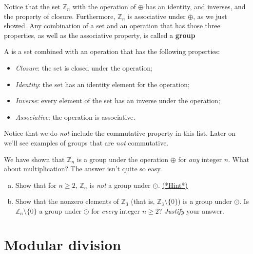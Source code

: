 Notice that the set ${\mathbb Z}_n$ with the operation of $\oplus$ has an identity, and inverses, and the property of closure. Furthermore, ${\mathbb Z}_n$ is associative under $\oplus$, as we just showed.  Any combination of a set and an operation that has those three properties, as well as the associative property, is called a \textbf{group} 

\begin{defn}  A  is a set combined with an operation that has the following properties:
\begin{itemize}
\item \emph{Closure}: the set is closed under the operation;
\item \emph{Identity}: the set has an identity element for the operation;
\item \emph{Inverse}: every element of the set has an inverse under the operation;
\item \emph{Associative}: the operation is associative.
\end{itemize}
\end{defn}

\noindent
Notice that we do  \emph{not} include the commutative property in this list. Later on we'll see examples of groups that are \emph{not} commutative. 

We have shown that  ${\mathbb Z}_n$ is a group under the operation $\oplus$ for \emph{any} integer $n$. What about multiplication? The answer isn't quite so easy.

\begin{exercise}{64}
\begin{enumerate}[(a)]
\item Show that for $n \ge 2$, ${\mathbb Z}_n$ is \emph{not} a group under $\odot$. 
\hyperref[sec:modular_arithmetic:hints]{(*Hint*)}
\item
Show that the nonzero elements of ${\mathbb Z}_3$ (that is, ${\mathbb Z}_3 \setminus \{0\}$)  is a group under $\odot$.
Is ${\mathbb Z}_n \setminus \{0\}$ a group under $\odot$ for \emph{every} integer $n \ge 2$?  \emph{Justify} your answer.
\end{enumerate}
\end{exercise}


 \section{Modular division}\label{euclidean}

